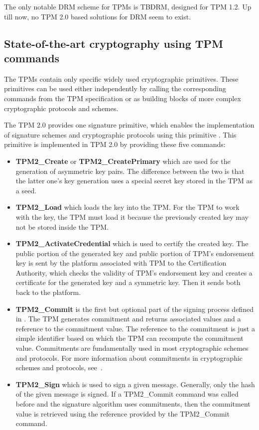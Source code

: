 The only notable DRM scheme for TPMs is TBDRM, \cite{yu2009tbdrm} designed for TPM 1.2. Up till now, no TPM 2.0 based solutions for DRM seem to exist. 

\subsection{State-of-the-art cryptography using TPM commands}
The TPMs contain only specific widely used cryptographic primitives. These primitives can be used either independently by calling the corresponding commands from the TPM specification or as building blocks of more complex cryptographic protocols and schemes. 

The TPM 2.0 provides one signature primitive, which enables the implementation of signature schemes and cryptographic protocols using this primitive \cite{chen2013flexible}. This primitive is implemented in TPM 2.0 by providing these five commands:
\begin{itemize}
    \item \textbf{TPM2\_Create} or \textbf{TPM2\_CreatePrimary} which are used for the generation of asymmetric key pairs. The difference between the two is that the latter one's key generation uses a special secret key stored in the TPM as a seed.
    \item \textbf{TPM2\_Load} which loads the key into the TPM. For the TPM to work with the key, the TPM must load it because the previously created key may not be stored inside the TPM.
    \item \textbf{TPM2\_ActivateCredential} which is used to certify the created key. The public portion of the generated key and public portion of TPM's endorsement key is sent by the platform associated with TPM to the Certification Authority, which checks the validity of TPM's endorsement key and creates a certificate for the generated key and a symmetric key. Then it sends both back to the platform.
    \item \textbf{TPM2\_Commit} is the first but optional part of the signing process defined in \cite{chen2013flexible}. The TPM generates commitment and returns associated values and a reference to the commitment value. The reference to the commitment is just a simple identifier based on which the TPM can recompute the commitment value. Commitments are fundamentally used in most cryptographic schemes and protocols. For more information about commitments in cryptographic schemes and protocols, see~\cite{damgaard1998commitment}. 
    \item \textbf{TPM2\_Sign} which is used to sign a given message. Generally, only the hash of the given message is signed. If a TPM2\_Commit command was called before and the signature algorithm uses commitments, then the commitment value is retrieved using the reference provided by the TPM2\_Commit command.
\end{itemize}
